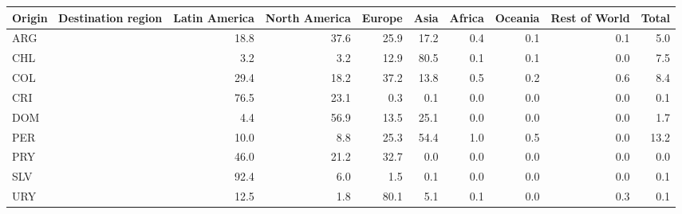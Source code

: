 \begin{tabular}{lrrrrrrrr}
\toprule
Origin \ Destination region & Latin America & North America & Europe & Asia & Africa & Oceania & Rest of World & Total \\
\midrule
ARG & 18.8 & 37.6 & 25.9 & 17.2 & 0.4 & 0.1 & 0.1 & 5.0 \\
CHL & 3.2 & 3.2 & 12.9 & 80.5 & 0.1 & 0.1 & 0.0 & 7.5 \\
COL & 29.4 & 18.2 & 37.2 & 13.8 & 0.5 & 0.2 & 0.6 & 8.4 \\
CRI & 76.5 & 23.1 & 0.3 & 0.1 & 0.0 & 0.0 & 0.0 & 0.1 \\
DOM & 4.4 & 56.9 & 13.5 & 25.1 & 0.0 & 0.0 & 0.0 & 1.7 \\
PER & 10.0 & 8.8 & 25.3 & 54.4 & 1.0 & 0.5 & 0.0 & 13.2 \\
PRY & 46.0 & 21.2 & 32.7 & 0.0 & 0.0 & 0.0 & 0.0 & 0.0 \\
SLV & 92.4 & 6.0 & 1.5 & 0.1 & 0.0 & 0.0 & 0.0 & 0.1 \\
URY & 12.5 & 1.8 & 80.1 & 5.1 & 0.1 & 0.0 & 0.3 & 0.1 \\
\bottomrule
\end{tabular}
